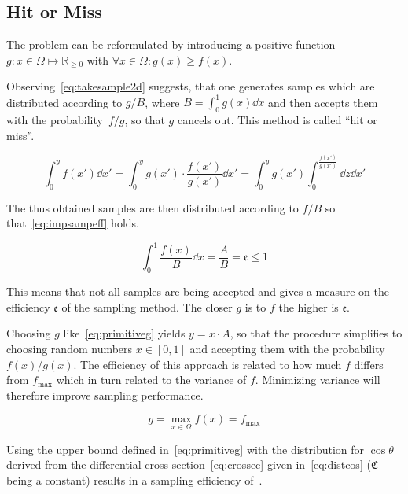 \subsection{Hit or Miss}%
\label{sec:hitmiss}

The problem can be reformulated by introducing a
positive function \(g\colon x\in\Omega\mapsto\mathbb{R}_{\geq 0}\)
with \(\forall x\in\Omega\colon g(x)\geq
f(x)\).

Observing~\eqref{eq:takesample2d} suggests, that one generates samples
which are distributed according to \(g/B\), where
\(B=\int_0^1g(x)\dd{x}\) and then accepts them with the
probability~\(f/g\), so that \(g\) cancels out. This method is called
``hit or miss''.

\begin{equation}
  \label{eq:takesample2d}
  \int_{0}^{y}f(x')\dd{x'} =
  \int_{0}^{y}g(x')\cdot\frac{f(x')}{g(x')}\dd{x'}
  = \int_{0}^{y}g(x')\int_{0}^{\frac{f(x')}{g(x')}}\dd{z}\dd{x'}
\end{equation}

The thus obtained samples are then distributed according to \(f/B\) so
that~\eqref{eq:impsampeff} holds.

\begin{equation}
  \label{eq:impsampeff}
  \int_0^1\frac{f(x)}{B}\dd{x} = \frac{A}{B} = \mathfrak{e}\leq 1
\end{equation}

This means that not all samples are being accepted and gives a measure
on the efficiency \(\mathfrak{e}\) of the sampling method. The closer
\(g\) is to \(f\) the higher is \(\mathfrak{e}\).

Choosing \(g\) like~\eqref{eq:primitiveg} yields \(y = x\cdot A\), so
that the procedure simplifies to choosing random numbers
\(x\in [0,1]\) and accepting them with the probability
\(f(x)/g(x)\). The efficiency of this approach is related to how much
\(f\) differs from \(f_{\text{max}}\) which in turn related to the
variance of \(f\). Minimizing variance will therefore improve sampling
performance.

\begin{equation}
  \label{eq:primitiveg}
  g=\max_{x\in\Omega}f(x)=f_{\text{max}}
\end{equation}

Using the upper bound defined in~\eqref{eq:primitiveg} with the
distribution for \(\cos\theta\) derived from the differential cross
section~\eqref{eq:crossec} given in~\eqref{eq:distcos}
(\(\mathfrak{C}\) being a constant) results in a sampling efficiency
of~.

